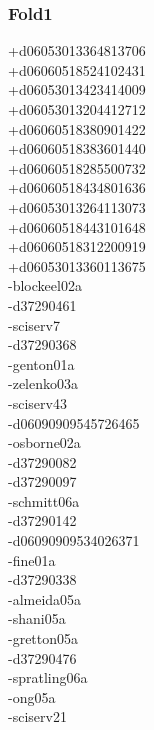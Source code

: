 \begin{multicols}{4}
\subsubsection*{Fold1}
+d06053013364813706\\
+d06060518524102431\\
+d06053013423414009\\
+d06053013204412712\\
+d06060518380901422\\
+d06060518383601440\\
+d06060518285500732\\
+d06060518434801636\\
+d06053013264113073\\
+d06060518443101648\\
+d06060518312200919\\
+d06053013360113675\\
-blockeel02a\\
-d37290461\\
-sciserv7\\
-d37290368\\
-genton01a\\
-zelenko03a\\
-sciserv43\\
-d06090909545726465\\
-osborne02a\\
-d37290082\\
-d37290097\\
-schmitt06a\\
-d37290142\\
-d06090909534026371\\
-fine01a\\
-d37290338\\
-almeida05a\\
-shani05a\\
-gretton05a\\
-d37290476\\
-spratling06a\\
-ong05a\\
-sciserv21\\

\end{multicols}
